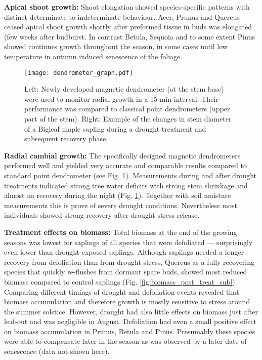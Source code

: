 \documentclass{article}
\begin{document}
	\textbf{Apical shoot growth:}
	Shoot elongation showed species-specific patterns with distinct determinate to indeterminate behaviour. Acer, Prunus and Quercus ceased apical shoot growth shortly after preformed tissue in buds was elongated (few weeks after budburst. In contrast Betula, Sequoia and to some extent Pinus showed continues growth throughout the season, in some cases until low temperature in autumn induced senescence of the foliage.\\
			\begin{figure}[H]
			\centering
			\texttt{[image: dendrometer\_graph.pdf]} 
			\caption{Left: Newly developed magnetic dendrometer (at the stem base) were used to monitor radial growth in a 15 min interval. Their performance was compared to classical point dendrometers (upper part of the stem). Right: Example of the changes in stem diameter of a Bigleaf maple sapling during a drought treatment and subsequent recovery phase.}
			\label{fig:dendrometer_graph}
		\end{figure}
		
	\textbf{Radial cambial growth:}
	The specifically designed magnetic dendrometers performed well and yielded very accurate and comparable results compared to standard point dendrometer (see Fig. \ref{fig:dendrometer_graph}). Measurements during and after drought treatments indicated strong tree water deficits with strong stem shrinkage and almost no recovery during the night (Fig. \ref{fig:dendrometer_graph}). Together with soil moisture measurements this is prove of severe drought conditions. Nevertheless most individuals showed strong recovery after drought stress release. 
	

	
	\textbf{Treatment effects on biomass:}
	Total biomass at the end of the growing seasons was lowest for saplings of all species that were defoliated --- surprisingly even lower than drought-exposed saplings. Although saplings needed a longer recovery from defoliation than from drought stress, Quercus as a fully recovering species that quickly re-flushes from dormant spare buds, showed most reduced biomass compared to control saplings (Fig. \ref{fig:biomass_post_treat_sub}).
	Comparing different timings of drought and defoliation events revealed that biomass accumulation and therefore growth is mostly sensitive to stress around the summer solstice. However, drought had also little effects on biomass just after leaf-out and was negligible in August. Defoliation had even a small positive effect on biomass accumulation in Prunus, Betula and Pinus. Presumably these species were able to compensate later in the season as was observed by a later date of senescence (data not shown here).
	\\
	
\end{document}
